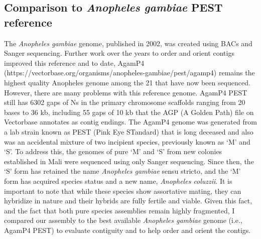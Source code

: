 




\subsection{Comparison to \textit{Anopheles gambiae} PEST reference}

\par{
The \textit{Anopheles gambiae} genome, published in 2002, was created using BACs and Sanger sequencing\cite{PEST}. Further work over the years to order and orient contigs improved this reference\cite{PEST2}\cite{heterochromatin} and to date, AgamP4 (https://vectorbase.org/organisms/anopheles-gambiae/pest/agamp4) remains the highest quality Anopheles genome among the 21 that have now been sequenced\cite{16anopheles}. However, there are many problems with this reference genome. AgamP4 PEST still has 6302 gaps of Ns in the primary chromosome scaffolds ranging from 20 bases to 36 kb, including 55 gaps of 10 kb that the AGP (A Golden Path) file on Vectorbase annotates as contig endings. The AgamP4 genome was generated from a lab strain known as PEST (Pink Eye STandard) that is long deceased and also was an accidental mixture of two incipient species, previously known as `M' and `S'. To address this, the genomes of pure `M' and `S' from new colonies established in Mali were sequenced using only Sanger sequencing\cite{anophdivergence}. Since then, the `S' form has retained the name \textit{Anopheles gambiae} sensu stricto, and the `M' form has acquired species status and a new name, \textit{Anopheles coluzzii}\cite{gambiaecomplex}. It is important to note that while these species show assortative mating, they can hybridize in nature and their hybrids are fully fertile and viable\cite{assortativemating}. Given this fact, and the fact that both pure species assemblies remain highly fragmented, I compared our assembly to the best available \textit{Anopheles gambiae} genome (i.e., AgamP4 PEST) to evaluate contiguity and to help order and orient the contigs.
} 

